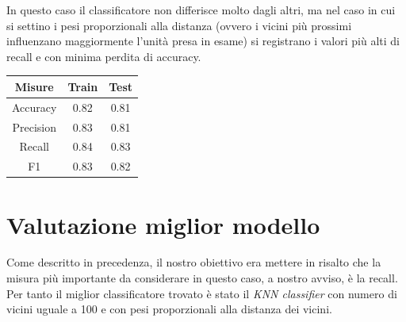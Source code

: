 In questo caso il classificatore non differisce molto dagli altri,
ma nel caso in cui si settino i pesi proporzionali alla distanza
(ovvero i vicini pi\`u prossimi influenzano maggiormente l'unit\`a
presa in esame) si registrano i valori pi\`u alti di recall e con
minima perdita di accuracy.

\begin{center}
	\begin{tabular}{c|c|c}
		\hline
		\textbf{Misure} & \textbf{Train} & \textbf{Test}\\
		\hline
		Accuracy & 0.82 & 0.81\\
		\hline
		Precision & 0.83 & 0.81\\
		\hline
		Recall & 0.84 & 0.83\\
		\hline
		F1 & 0.83 & 0.82\\
		\hline
	\end{tabular}
\end{center}

\section{Valutazione miglior modello}
Come descritto in precedenza, il nostro obiettivo era mettere in
risalto che la misura pi\`u importante da considerare
in questo caso, a nostro avviso, \`e la recall.
Per tanto il miglior classificatore trovato \`e stato il
\textit{KNN classifier} con numero di vicini uguale a 100
e con pesi proporzionali alla distanza dei vicini.
